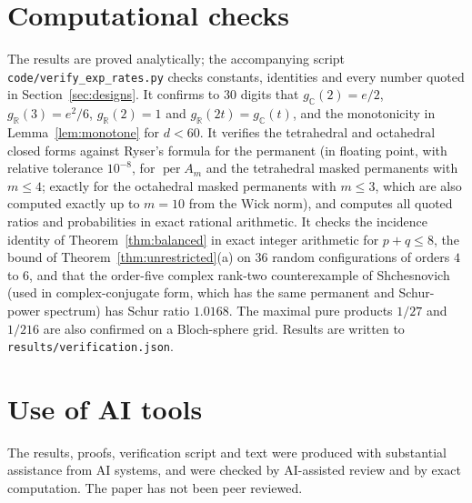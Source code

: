 \documentclass[11pt,a4paper]{article}
\theoremstyle{remark}
\newcommand{\per}{\operatorname{per}}
\newcommand{\C}{\mathbb C}
\newcommand{\R}{\mathbb R}
\begin{document}
\section{Computational checks}\label{sec:checks}
The results are proved analytically; the accompanying script \texttt{code/verify\_exp\_rates.py} checks constants, identities and every number quoted in Section~\ref{sec:designs}. It confirms to 30 digits that $g_\C(2)=e/2$, $g_\R(3)=e^2/6$, $g_\R(2)=1$ and $g_\R(2t)=g_\C(t)$, and the monotonicity in Lemma~\ref{lem:monotone} for $d<60$. It verifies the tetrahedral and octahedral closed forms against Ryser's formula for the permanent (in floating point, with relative tolerance $10^{-8}$, for $\per A_m$ and the tetrahedral masked permanents with $m\le4$; exactly for the octahedral masked permanents with $m\le3$, which are also computed exactly up to $m=10$ from the Wick norm), and computes all quoted ratios and probabilities in exact rational arithmetic. It checks the incidence identity of Theorem~\ref{thm:balanced} in exact integer arithmetic for $p+q\le8$, the bound of Theorem~\ref{thm:unrestricted}(a) on 36 random configurations of orders $4$ to $6$, and that the order-five complex rank-two counterexample of Shchesnovich \cite[Eq.~(3)]{Shch} (used in complex-conjugate form, which has the same permanent and Schur-power spectrum) has Schur ratio $1.0168$. The maximal pure products $1/27$ and $1/216$ are also confirmed on a Bloch-sphere grid. Results are written to \texttt{results/verification.json}.

\section*{Use of AI tools}
The results, proofs, verification script and text were produced with substantial assistance from AI systems, and were checked by AI-assisted review and by exact computation. The paper has not been peer reviewed.
\end{document}
